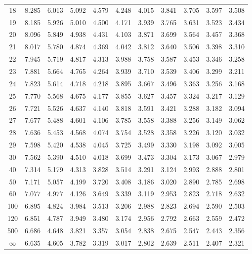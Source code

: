 \documentclass[12pt]{article}
\begin{document}
\begin{table}
\begin{center}
{\begin{tabular}{|c|c|c|c|c|c|c|c|c|c|c|}
18& 8.285& 6.013& 5.092& 4.579 &4.248& 4.015& 3.841& 3.705& 3.597& 3.508\\
19& 8.185& 5.926& 5.010 &4.500& 4.171& 3.939& 3.765 &3.631& 3.523& 3.434\\
20& 8.096& 5.849& 4.938& 4.431& 4.103& 3.871 &3.699& 3.564& 3.457 &3.368\\
21& 8.017& 5.780& 4.874& 4.369& 4.042& 3.812& 3.640& 3.506 &3.398& 3.310\\
22 &7.945& 5.719& 4.817& 4.313& 3.988& 3.758 &3.587& 3.453& 3.346& 3.258\\
23& 7.881& 5.664& 4.765& 4.264& 3.939 &3.710& 3.539 &3.406 &3.299& 3.211\\
24& 7.823& 5.614& 4.718& 4.218& 3.895& 3.667 &3.496& 3.363 &3.256& 3.168\\
25&7.770& 5.568& 4.675& 4.177& 3.855& 3.627& 3.457& 3.324& 3.217 &3.129\\
26 &7.721 &5.526& 4.637& 4.140& 3.818& 3.591 &3.421& 3.288& 3.182& 3.094\\
27& 7.677& 5.488& 4.601 &4.106& 3.785 &3.558& 3.388& 3.256& 3.149 &3.062\\
28& 7.636& 5.453& 4.568& 4.074& 3.754& 3.528 &3.358& 3.226& 3.120& 3.032 \\
29 &7.598 &5.420 &4.538& 4.045& 3.725& 3.499& 3.330& 3.198& 3.092& 3.005 \\
30& 7.562 &5.390& 4.510& 4.018& 3.699& 3.473& 3.304 &3.173& 3.067 &2.979\\
40& 7.314& 5.179& 4.313& 3.828& 3.514& 3.291& 3.124& 2.993& 2.888 &2.801\\
50& 7.171& 5.057& 4.199& 3.720& 3.408& 3.186& 3.020& 2.890& 2.785& 2.698\\
60& 7.077& 4.977& 4.126& 3.649& 3.339& 3.119 &2.953& 2.823& 2.718& 2.632\\
100& 6.895& 4.824& 3.984& 3.513& 3.206& 2.988& 2.823& 2.694& 2.590& 2.503\\
120& 6.851& 4.787& 3.949& 3.480& 3.174& 2.956& 2.792& 2.663& 2.559& 2.472\\
500& 6.686 &4.648 &3.821& 3.357& 3.054& 2.838& 2.675& 2.547& 2.443& 2.356\\ \hline
$\infty$ & 6.635& 4.605& 3.782& 3.319& 3.017& 2.802& 2.639& 2.511& 2.407& 2.321\\
  \hline
\end{tabular}
}
\end{center}
\end{table}

\end{document}
